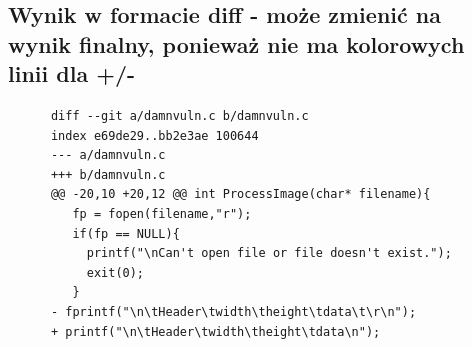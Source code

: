\subsection{Wynik w formacie diff - może zmienić na wynik finalny, ponieważ nie ma kolorowych linii dla +/-}
\begin{listing}[H]
    \begin{verbatim}
      diff --git a/damnvuln.c b/damnvuln.c
      index e69de29..bb2e3ae 100644
      --- a/damnvuln.c
      +++ b/damnvuln.c
      @@ -20,10 +20,12 @@ int ProcessImage(char* filename){
         fp = fopen(filename,"r"); 
         if(fp == NULL){
           printf("\nCan't open file or file doesn't exist.");
           exit(0);
         }
      -	fprintf("\n\tHeader\twidth\theight\tdata\t\r\n");
      +	printf("\n\tHeader\twidth\theight\tdata\n");
       

\end{verbatim}
\end{listing}
